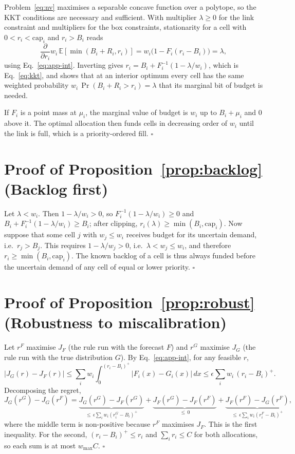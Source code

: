 Problem~\eqref{eq:nv} maximises a separable concave function over a polytope, so the KKT conditions are necessary and sufficient. With multiplier $\lambda \ge 0$ for the link constraint and multipliers for the box constraints, stationarity for a cell with $0 < r_i < \mathrm{cap}_i$ and $r_i > B_i$ reads
\[
  \frac{\partial}{\partial r_i} w_i\,\mathbb{E}[\min(B_i + R_i, r_i)] = w_i\big(1 - F_i(r_i - B_i)\big) = \lambda ,
\]
using Eq.~\eqref{eq:app-int}. Inverting gives $r_i = B_i + F_i^{-1}(1 - \lambda/w_i)$, which is Eq.~\eqref{eq:kkt}, and shows that at an interior optimum every cell has the same weighted probability $w_i\,\Pr(B_i + R_i > r_i) = \lambda$ that its marginal bit of budget is needed.

If $F_i$ is a point mass at $\mu_i$, the marginal value of budget is $w_i$ up to $B_i + \mu_i$ and $0$ above it. The optimal allocation then funds cells in decreasing order of $w_i$ until the link is full, which is a priority-ordered fill. \hfill$\square$

\section*{Proof of Proposition~\ref{prop:backlog} (Backlog first)}

Let $\lambda < w_i$. Then $1 - \lambda/w_i > 0$, so $F_i^{-1}(1 - \lambda/w_i) \ge 0$ and $B_i + F_i^{-1}(1 - \lambda/w_i) \ge B_i$; after clipping, $r_i(\lambda) \ge \min(B_i, \mathrm{cap}_i)$. Now suppose that some cell $j$ with $w_j \le w_i$ receives budget for its uncertain demand, i.e.\ $r_j > B_j$. This requires $1 - \lambda/w_j > 0$, i.e.\ $\lambda < w_j \le w_i$, and therefore $r_i \ge \min(B_i, \mathrm{cap}_i)$. The known backlog of a cell is thus always funded before the uncertain demand of any cell of equal or lower priority. \hfill$\square$

\section*{Proof of Proposition~\ref{prop:robust} (Robustness to miscalibration)}

Let $r^F$ maximise $J_F$ (the rule run with the forecast $F$) and $r^G$ maximise $J_G$ (the rule run with the true distribution $G$). By Eq.~\eqref{eq:app-int}, for any feasible $r$,
\[
  \big|J_G(r) - J_F(r)\big| \le \sum_i w_i \int_0^{(r_i - B_i)^+} \big|F_i(x) - G_i(x)\big|\,dx
  \le \epsilon \sum_i w_i\,(r_i - B_i)^+ .
\]
Decomposing the regret,
\[
  J_G(r^G) - J_G(r^F)
  = \underbrace{J_G(r^G) - J_F(r^G)}_{\le\, \epsilon\sum_i w_i (r^G_i - B_i)^+}
  + \underbrace{J_F(r^G) - J_F(r^F)}_{\le\, 0}
  + \underbrace{J_F(r^F) - J_G(r^F)}_{\le\, \epsilon\sum_i w_i (r^F_i - B_i)^+},
\]
where the middle term is non-positive because $r^F$ maximises $J_F$. This is the first inequality. For the second, $(r_i - B_i)^+ \le r_i$ and $\sum_i r_i \le C$ for both allocations, so each sum is at most $w_{\max} C$. \hfill$\square$

